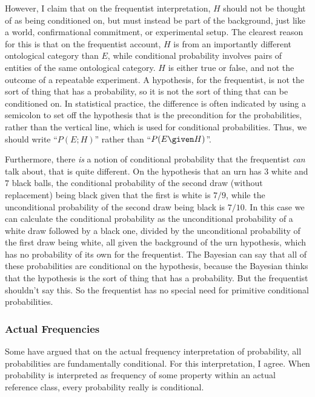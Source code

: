 However, I claim that on the frequentist interpretation, $H$ should not be thought of as being conditioned on, but must instead be part of the background, just like a world, confirmational commitment, or experimental setup. The clearest reason for this is that on the frequentist account, $H$ is from an importantly different ontological category than $E$, while conditional probability involves pairs of entities of the same ontological category. $H$ is either true or false, and not the outcome of a repeatable experiment. A hypothesis, for the frequentist, is not the sort of thing that has a probability, so it is not the sort of thing that can be conditioned on. In statistical practice, the difference is often indicated by using a semicolon to set off the hypothesis that is the precondition for the probabilities, rather than the vertical line, which is used for conditional probabilities. Thus, we should write ``$P(E; H)$'' rather than ``$P(E \given H)$''.

Furthermore, there \emph{is} a notion of conditional probability that the frequentist \emph{can} talk about, that is quite different. On the hypothesis that an urn has $3$ white and $7$ black balls, the conditional probability of the second draw (without replacement) being black given that the first is white is $7/9$, while the unconditional probability of the second draw being black is $7/10$. In this case we can calculate the conditional probability as the unconditional probability of a white draw followed by a black one, divided by the unconditional probability of the first draw being white, all given the background of the urn hypothesis, which has no probability of its own for the frequentist. The Bayesian can say that all of these probabilities are conditional on the hypothesis, because the Bayesian thinks that the hypothesis is the sort of thing that has a probability. But the frequentist shouldn't say this. So the frequentist has no special need for primitive conditional probabilities.

\subsubsection{Actual Frequencies}

Some have argued that on the actual frequency interpretation of probability, all probabilities are fundamentally conditional. For this interpretation, I agree. When probability is interpreted as frequency of some property within an actual reference class, every probability really is conditional.

